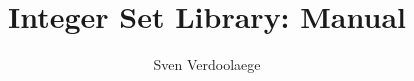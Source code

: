 \documentclass{article}
\begin{document}
\title{Integer Set Library: Manual}
\author{Sven Verdoolaege}

\maketitle
\tableofcontents


\end{document}
